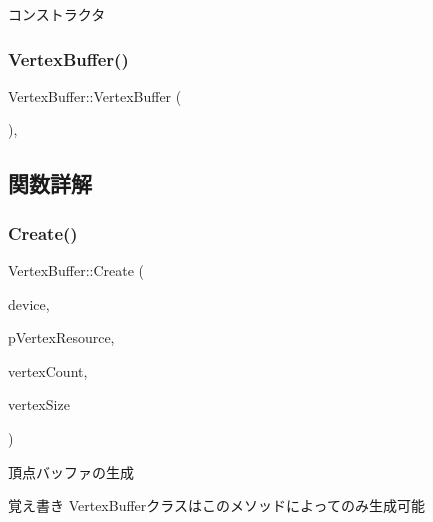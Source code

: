 コンストラクタ 

\mbox{\label{class_vertex_buffer_a5e6393d302e2e7b1ed0c8477298793f3}} 
\subsubsection{\texorpdfstring{Vertex\+Buffer()}{VertexBuffer()}\hspace{0.1cm}{\footnotesize\ttfamily [2/2]}}
{\footnotesize\ttfamily Vertex\+Buffer\+::\+Vertex\+Buffer (\begin{DoxyParamCaption}\item[{const \mbox{\hyperlink{class_vertex_buffer}{Vertex\+Buffer}} \&}]{ }\end{DoxyParamCaption})\hspace{0.3cm}{\ttfamily [inline]}, {\ttfamily [protected]}}



\subsection{関数詳解}
\mbox{\label{class_vertex_buffer_a29dc2a0375049af708962af8db2ba2fd}} 
\subsubsection{\texorpdfstring{Create()}{Create()}}
{\footnotesize\ttfamily Vertex\+Buffer\+::\+Create (\begin{DoxyParamCaption}\item[{std\+::shared\+\_\+ptr$<$ \mbox{\hyperlink{class_device}{Device}} $>$}]{device,  }\item[{void $\ast$}]{p\+Vertex\+Resource,  }\item[{size\+\_\+t}]{vertex\+Count,  }\item[{size\+\_\+t}]{vertex\+Size }\end{DoxyParamCaption})\hspace{0.3cm}{\ttfamily [static]}}

頂点バッファの生成 \begin{DoxyNote}{覚え書き}
Vertex\+Bufferクラスはこのメソッドによってのみ生成可能 
\end{DoxyNote}

